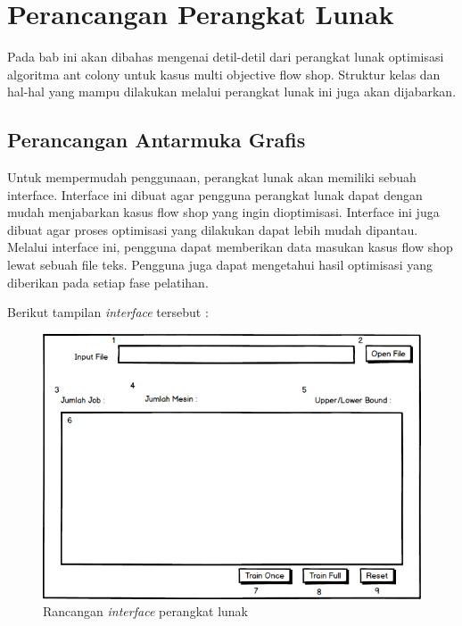 \chapter{Perancangan Perangkat Lunak}
\label{chap:perancangan}

	Pada bab ini akan dibahas mengenai detil-detil dari perangkat lunak optimisasi algoritma ant colony
	untuk kasus multi objective flow shop. Struktur kelas dan hal-hal yang mampu dilakukan  melalui perangkat 
	lunak ini juga akan dijabarkan.
	
\section{Perancangan Antarmuka Grafis}
	
	Untuk mempermudah penggunaan, perangkat lunak akan memiliki sebuah interface. Interface ini
	dibuat agar pengguna perangkat lunak dapat dengan mudah menjabarkan kasus flow shop yang ingin dioptimisasi. 
	Interface ini juga dibuat agar proses optimisasi yang dilakukan dapat lebih mudah dipantau. Melalui interface ini, 
	pengguna dapat memberikan data masukan kasus flow shop lewat sebuah file teks. 
	Pengguna juga dapat mengetahui hasil optimisasi yang diberikan pada setiap fase pelatihan.
	
	Berikut tampilan {\it interface} tersebut : 
	\begin{figure}[H]
		\centering
		\includegraphics[scale=0.65]{RancanganGrafis}
		\caption[Rancangan {\it interfcae} perangkat lunak]{Rancangan {\it interface} perangkat lunak}
		\label{fig:rancanganinterface}
	\end{figure}
	
